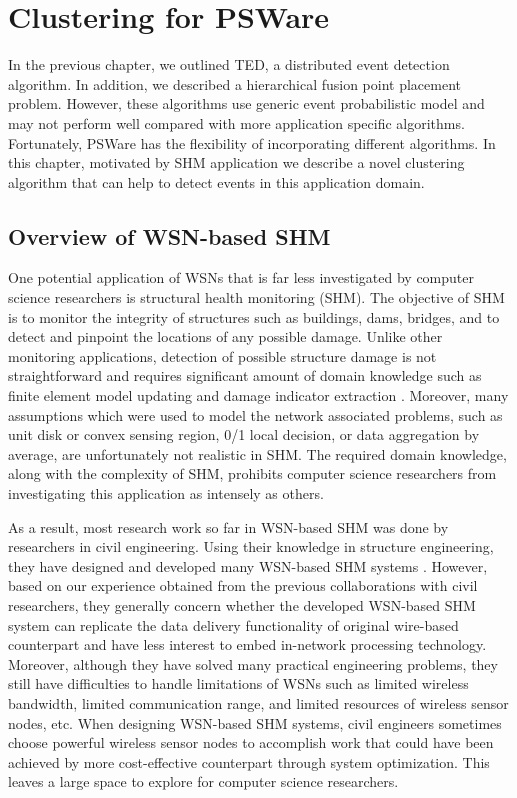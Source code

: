 \chapter{Clustering for PSWare}
\label{chapter:clustering}
In the previous chapter, we outlined TED, a distributed event detection algorithm. In addition, we described a hierarchical fusion point placement problem. However, these algorithms use generic event probabilistic model and may not perform well compared with more application specific algorithms. Fortunately, PSWare has the flexibility of incorporating different algorithms. In this chapter, motivated by SHM application we describe a novel clustering algorithm that can help to detect events in this application domain.

\section{Overview of WSN-based SHM}
One potential application of WSNs that is far less investigated by computer science researchers is structural health monitoring (SHM).  The objective of SHM is to monitor the integrity of structures such as buildings, dams, bridges, and to detect and pinpoint the locations of any possible damage. Unlike other monitoring applications, detection of possible structure damage is not straightforward and requires significant amount of domain knowledge such as finite element model updating and damage indicator extraction \cite{farrar2007introduction}. Moreover, many assumptions which were used to model the network associated problems, such as unit disk or convex sensing region, 0/1 local decision, or data aggregation by average, are unfortunately not realistic in SHM.  The required domain knowledge, along with the complexity of SHM, prohibits computer science researchers from investigating this application as intensely as others.

As a result, most research work so far in WSN-based SHM was done by researchers in civil engineering.  Using their knowledge in structure engineering, they have designed and developed many WSN-based SHM systems \cite{lynch2003embedment}\cite{nagayama2008structural}. However, based on our experience obtained from the previous collaborations with civil researchers, they generally concern whether the developed WSN-based SHM system can replicate the data delivery functionality of original wire-based counterpart and have less interest to embed in-network processing technology. Moreover, although they have solved many practical engineering problems, they still have difficulties to handle limitations of WSNs such as limited wireless bandwidth, limited communication range, and limited resources of wireless sensor nodes, etc.  When designing WSN-based SHM systems, civil engineers sometimes choose powerful wireless sensor nodes to accomplish work that could have been achieved by more cost-effective counterpart through system optimization. This leaves a large space to explore for computer science researchers.


